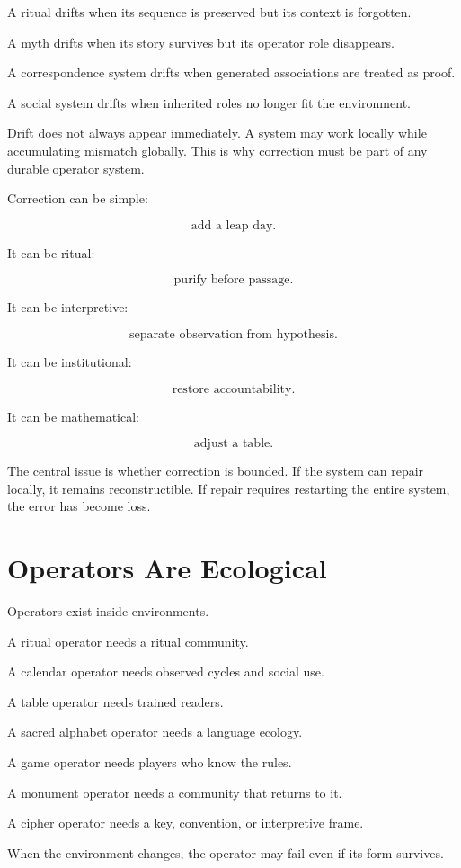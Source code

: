 \documentclass[11pt]{book}
\begin{document}
A ritual drifts when its sequence is preserved but its context is forgotten.

A myth drifts when its story survives but its operator role disappears.

A correspondence system drifts when generated associations are treated as proof.

A social system drifts when inherited roles no longer fit the environment.

Drift does not always appear immediately. A system may work locally while accumulating mismatch globally. This is why correction must be part of any durable operator system.

Correction can be simple:

\[
\text{add a leap day}.
\]

It can be ritual:

\[
\text{purify before passage}.
\]

It can be interpretive:

\[
\text{separate observation from hypothesis}.
\]

It can be institutional:

\[
\text{restore accountability}.
\]

It can be mathematical:

\[
\text{adjust a table}.
\]

The central issue is whether correction is bounded. If the system can repair locally, it remains reconstructible. If repair requires restarting the entire system, the error has become loss.

\section{Operators Are Ecological}

Operators exist inside environments.

A ritual operator needs a ritual community.

A calendar operator needs observed cycles and social use.

A table operator needs trained readers.

A sacred alphabet operator needs a language ecology.

A game operator needs players who know the rules.

A monument operator needs a community that returns to it.

A cipher operator needs a key, convention, or interpretive frame.

When the environment changes, the operator may fail even if its form survives.
\end{document}
